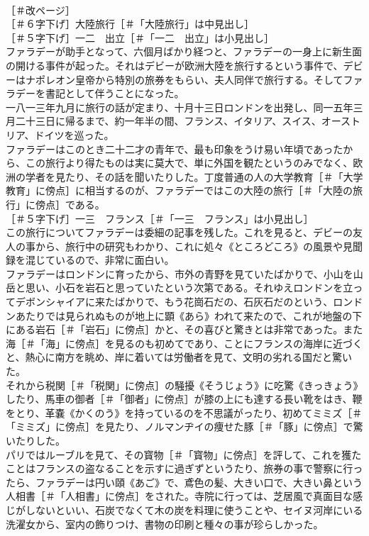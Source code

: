 \documentclass[8pt]{extreport}
\begin{document}
\begin{CJK}{UTF8}{min}
\\	［＃改ページ］
\\	［＃６字下げ］大陸旅行［＃「大陸旅行」は中見出し］
\\	［＃５字下げ］一二　出立［＃「一二　出立」は小見出し］
\\	ファラデーが助手となって、六個月ばかり経つと、ファラデーの一身上に新生面の開ける事件が起った。それはデビーが欧洲大陸を旅行するという事件で、デビーはナポレオン皇帝から特別の旅券をもらい、夫人同伴で旅行する。そしてファラデーを書記として伴うことになった。
\\	一八一三年九月に旅行の話が定まり、十月十三日ロンドンを出発し、同一五年三月二十三日に帰るまで、約一年半の間、フランス、イタリア、スイス、オーストリア、ドイツを巡った。
\\	ファラデーはこのとき二十二才の青年で、最も印象をうけ易い年頃であったから、この旅行より得たものは実に莫大で、単に外国を観たというのみでなく、欧洲の学者を見たり、その話を聞いたりした。丁度普通の人の大学教育［＃「大学教育」に傍点］に相当するのが、ファラデーではこの大陸の旅行［＃「大陸の旅行」に傍点］である。
\\	［＃５字下げ］一三　フランス［＃「一三　フランス」は小見出し］
\\	この旅行についてファラデーは委細の記事を残した。これを見ると、デビーの友人の事から、旅行中の研究もわかり、これに処々《ところどころ》の風景や見聞録を混じているので、非常に面白い。
\\	ファラデーはロンドンに育ったから、市外の青野を見ていたばかりで、小山を山岳と思い、小石を岩石と思っていたという次第である。それゆえロンドンを立ってデボンシャイアに来たばかりで、もう花崗石だの、石灰石だのという、ロンドンあたりでは見られぬものが地上に顕《あら》われて来たので、これが地盤の下にある岩石［＃「岩石」に傍点］かと、その喜びと驚きとは非常であった。また海［＃「海」に傍点］を見るのも初めてであり、ことにフランスの海岸に近づくと、熱心に南方を眺め、岸に着いては労働者を見て、文明の劣れる国だと驚いた。
\\	それから税関［＃「税関」に傍点］の騒擾《そうじょう》に吃驚《きっきょう》したり、馬車の御者［＃「御者」に傍点］が膝の上にも達する長い靴をはき、鞭をとり、革嚢《かくのう》を持っているのを不思議がったり、初めてミミズ［＃「ミミズ」に傍点］を見たり、ノルマンヂイの痩せた豚［＃「豚」に傍点］で驚いたりした。
\\	パリではルーブルを見て、その寳物［＃「寳物」に傍点］を評して、これを獲たことはフランスの盗なることを示すに過ぎずというたり、旅券の事で警察に行ったら、ファラデーは円い頤《あご》で、鳶色の髪、大きい口で、大きい鼻という人相書［＃「人相書」に傍点］をされた。寺院に行っては、芝居風で真面目な感じがしないといい、石炭でなくて木の炭を料理に使うことや、セイヌ河岸にいる洗濯女から、室内の飾りつけ、書物の印刷と種々の事が珍らしかった。

\end{CJK}
\end{document}

